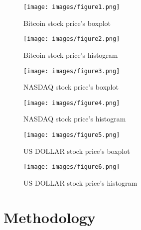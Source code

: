 \documentclass{ieeeojies}
\begin{document}
\begin{figure}[H]
    \centering
    \begin{minipage}{0.23\textwidth}
    \centering
    \texttt{[image: images/figure1.png]}
    \caption{Bitcoin stock price's boxplot}
    \label{fig:1}
    \end{minipage}
    \hfill
    \begin{minipage}{0.23\textwidth}
    \centering
    \texttt{[image: images/figure2.png]}
    \caption{Bitcoin stock price's histogram}
    \label{fig:2}
    \end{minipage}
\end{figure}

\begin{figure}[H]
    \centering
    \begin{minipage}{0.23\textwidth}
    \centering
    \texttt{[image: images/figure3.png]}
    \caption{NASDAQ stock price's boxplot}
    \label{fig:1}
    \end{minipage}
    \hfill
    \begin{minipage}{0.23\textwidth}
    \centering
    \texttt{[image: images/figure4.png]}
    \caption{NASDAQ stock price's histogram}
    \label{fig:2}
    \end{minipage}
\end{figure}

\begin{figure}[H]
    \centering
    \begin{minipage}{0.23\textwidth}
    \centering
    \texttt{[image: images/figure5.png]}
    \caption{US DOLLAR stock price's boxplot}
    \label{fig:1}
    \end{minipage}
    \hfill
    \begin{minipage}{0.23\textwidth}
    \centering
    \texttt{[image: images/figure6.png]}
    \caption{US DOLLAR stock price's histogram}
    \label{fig:2}
    \end{minipage}
\end{figure}

\section{Methodology} 
\end{document}
